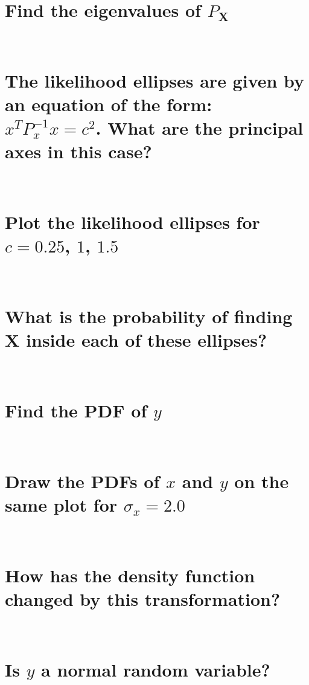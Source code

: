 \documentclass[12pt,letterpaper, onecolumn]{exam}
\begin{document}
\begin{questions}
\begin{parts}
            \part{Find the eigenvalues of $P_{\mathbf{X}}$}\\
                \solution
            \part{The likelihood ellipses are given by an equation of the form: $x^T P^{-1}_x x = c^2$. What are the principal axes in this case?}\\
                \solution
            \part{Plot the likelihood ellipses for $c = 0.25$, $1$, $1.5$}\\
                \solution
            \part{What is the probability of finding $\mathbf{X}$ inside each of these ellipses?}\\
                \solution    
        \end{parts}
\clearpage        
        \begin{parts}
            \part{Find the PDF of $y$}\\
                \solution
            \part{Draw the PDFs of $x$ and $y$ on the same plot for $\sigma_x = 2.0$}\\
                \solution
            \part{How has the density function changed by this transformation?}\\
                \solution
            \part{Is $y$ a normal random variable?}\\
                \solution    
        \end{parts}  
\end{questions}
\end{document}
